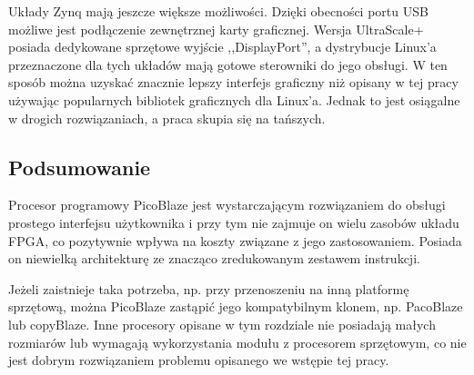 Układy Zynq mają jeszcze większe możliwości. Dzięki obecności portu USB możliwe jest podłączenie zewnętrznej karty graficznej. Wersja UltraScale+ posiada dedykowane sprzętowe wyjście ,,DisplayPort'', a dystrybucje Linux'a przeznaczone dla tych układów mają gotowe sterowniki do jego obsługi. W ten sposób można uzyskać znacznie lepszy interfejs graficzny niż opisany w tej pracy używając popularnych bibliotek graficznych dla Linux'a. Jednak to jest osiągalne w drogich rozwiązaniach, a praca skupia się na tańszych.


\subsection{Podsumowanie}


Procesor programowy PicoBlaze jest wystarczającym rozwiązaniem do obsługi prostego interfejsu użytkownika i przy tym nie zajmuje on wielu zasobów układu FPGA, co pozytywnie wpływa na koszty związane z jego zastosowaniem. Posiada on niewielką architekturę ze znacząco zredukowanym zestawem instrukcji.

Jeżeli zaistnieje taka potrzeba, np. przy przenoszeniu na inną platformę sprzętową, można PicoBlaze zastąpić jego kompatybilnym klonem, np. PacoBlaze lub copyBlaze. Inne procesory opisane w tym rozdziale nie posiadają małych rozmiarów lub wymagają wykorzystania modułu z procesorem sprzętowym, co nie jest dobrym rozwiązaniem problemu opisanego we wstępie tej pracy.


